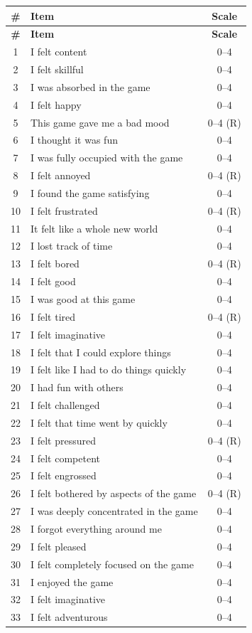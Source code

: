 \begin{longtable}{@{}clc@{}}
\toprule
\textbf{\#} & \textbf{Item} & \textbf{Scale} \\
\midrule
\endfirsthead
\toprule
\textbf{\#} & \textbf{Item} & \textbf{Scale} \\
\midrule
\endhead
1 & I felt content & 0--4 \\
2 & I felt skillful & 0--4 \\
3 & I was absorbed in the game & 0--4 \\
4 & I felt happy & 0--4 \\
5 & This game gave me a bad mood & 0--4 (R) \\
6 & I thought it was fun & 0--4 \\
7 & I was fully occupied with the game & 0--4 \\
8 & I felt annoyed & 0--4 (R) \\
9 & I found the game satisfying & 0--4 \\
10 & I felt frustrated & 0--4 (R) \\
11 & It felt like a whole new world & 0--4 \\
12 & I lost track of time & 0--4 \\
13 & I felt bored & 0--4 (R) \\
14 & I felt good & 0--4 \\
15 & I was good at this game & 0--4 \\
16 & I felt tired & 0--4 (R) \\
17 & I felt imaginative & 0--4 \\
18 & I felt that I could explore things & 0--4 \\
19 & I felt like I had to do things quickly & 0--4 \\
20 & I had fun with others & 0--4 \\
21 & I felt challenged & 0--4 \\
22 & I felt that time went by quickly & 0--4 \\
23 & I felt pressured & 0--4 (R) \\
24 & I felt competent & 0--4 \\
25 & I felt engrossed & 0--4 \\
26 & I felt bothered by aspects of the game & 0--4 (R) \\
27 & I was deeply concentrated in the game & 0--4 \\
28 & I forgot everything around me & 0--4 \\
29 & I felt pleased & 0--4 \\
30 & I felt completely focused on the game & 0--4 \\
31 & I enjoyed the game & 0--4 \\
32 & I felt imaginative & 0--4 \\
33 & I felt adventurous & 0--4 \\
\bottomrule
\end{longtable}

